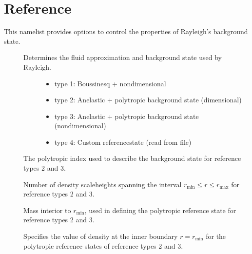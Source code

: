 \documentclass[letterpaper,11pt,english]{sphinxmanual}
\begin{document}
\section{Reference}
\label{\detokenize{doc/source/Namelist_Definitions/Namelist_Variables:reference}}
\sphinxAtStartPar
This namelist provides options to control the properties of Rayleigh’s background state.
\begin{description}
\item[{}] \leavevmode\begin{description}
\item[{Determines the fluid approximation and background state used by Rayleigh.}] \leavevmode\begin{itemize}
\item {} 
\sphinxAtStartPar
type 1:  Boussinesq + nondimensional

\item {} 
\sphinxAtStartPar
type 2:  Anelastic + polytropic background state (dimensional)

\item {} 
\sphinxAtStartPar
type 3:  Anelastic + polytropic background state (non\sphinxhyphen{}dimensional)

\item {} 
\sphinxAtStartPar
type 4:  Custom reference\sphinxhyphen{}state (read from file)

\end{itemize}

\end{description}

\item[{}] \leavevmode
\sphinxAtStartPar
The polytropic index used to describe the background state for reference types 2 and 3.

\item[{}] \leavevmode
\sphinxAtStartPar
Number of density scaleheights spanning the interval \(r_\mathrm{min}\le r\le r_\mathrm{max}\) for reference types 2 and 3.

\item[{}] \leavevmode
\sphinxAtStartPar
Mass interior to \(r_\mathrm{min}\), used in defining the polytropic reference state for reference types 2 and 3.

\item[{}] \leavevmode
\sphinxAtStartPar
Specifies the value of density at the inner boundary \(r=r_\mathrm{min}\) for the polytropic reference states of reference types 2 and 3.


\end{description}
\end{document}
